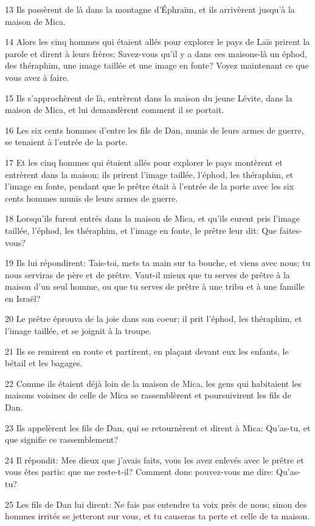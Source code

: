 \par 13 Ils passèrent de là dans la montagne d'Éphraïm, et ils arrivèrent jusqu'à la maison de Mica.
\par 14 Alors les cinq hommes qui étaient allés pour explorer le pays de Laïs prirent la parole et dirent à leurs frères: Savez-vous qu'il y a dans ces maisons-là un éphod, des théraphim, une image taillée et une image en fonte? Voyez maintenant ce que vous avez à faire.
\par 15 Ils s'approchèrent de là, entrèrent dans la maison du jeune Lévite, dans la maison de Mica, et lui demandèrent comment il se portait.
\par 16 Les six cents hommes d'entre les fils de Dan, munis de leurs armes de guerre, se tenaient à l'entrée de la porte.
\par 17 Et les cinq hommes qui étaient allés pour explorer le pays montèrent et entrèrent dans la maison; ils prirent l'image taillée, l'éphod, les théraphim, et l'image en fonte, pendant que le prêtre était à l'entrée de la porte avec les six cents hommes munis de leurs armes de guerre.
\par 18 Lorsqu'ils furent entrés dans la maison de Mica, et qu'ils eurent pris l'image taillée, l'éphod, les théraphim, et l'image en fonte, le prêtre leur dit: Que faites-vous?
\par 19 Ils lui répondirent: Tais-toi, mets ta main sur ta bouche, et viens avec nous; tu nous serviras de père et de prêtre. Vaut-il mieux que tu serves de prêtre à la maison d'un seul homme, ou que tu serves de prêtre à une tribu et à une famille en Israël?
\par 20 Le prêtre éprouva de la joie dans son coeur; il prit l'éphod, les théraphim, et l'image taillée, et se joignit à la troupe.
\par 21 Ils se remirent en route et partirent, en plaçant devant eux les enfants, le bétail et les bagages.
\par 22 Comme ils étaient déjà loin de la maison de Mica, les gens qui habitaient les maisons voisines de celle de Mica se rassemblèrent et poursuivirent les fils de Dan.
\par 23 Ils appelèrent les fils de Dan, qui se retournèrent et dirent à Mica: Qu'as-tu, et que signifie ce rassemblement?
\par 24 Il répondit: Mes dieux que j'avais faits, vous les avez enlevés avec le prêtre et vous êtes partis: que me reste-t-il? Comment donc pouvez-vous me dire: Qu'as-tu?
\par 25 Les fils de Dan lui dirent: Ne fais pas entendre ta voix près de nous; sinon des hommes irrités se jetteront sur vous, et tu causeras ta perte et celle de ta maison.
